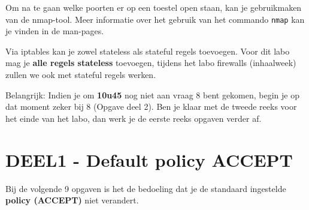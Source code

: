 \documentclass{report}
\begin{document}
Om na te gaan welke poorten er op een toestel open staan, kan je gebruikmaken van de nmap-tool. Meer informatie over het gebruik van het commando \texttt{nmap} kan je vinden in de man-pages.

Via iptables kan je zowel stateless als stateful regels toevoegen. Voor dit labo mag je \textbf{alle regels stateless} toevoegen, tijdens het labo firewalls (inhaalweek) zullen we ook met stateful regels werken. 

Belangrijk: Indien je om \textbf{10u45} nog niet aan vraag 8 bent gekomen, begin je op dat moment zeker bij 8 (Opgave deel 2). Ben je klaar met de tweede reeks voor het einde van het labo, dan werk je de eerste reeks opgaven verder af. 

\section{DEEL1 - Default policy ACCEPT}
Bij de volgende 9 opgaven is het de bedoeling dat je de standaard ingestelde \textbf{policy (ACCEPT)} niet verandert.
\end{document}
